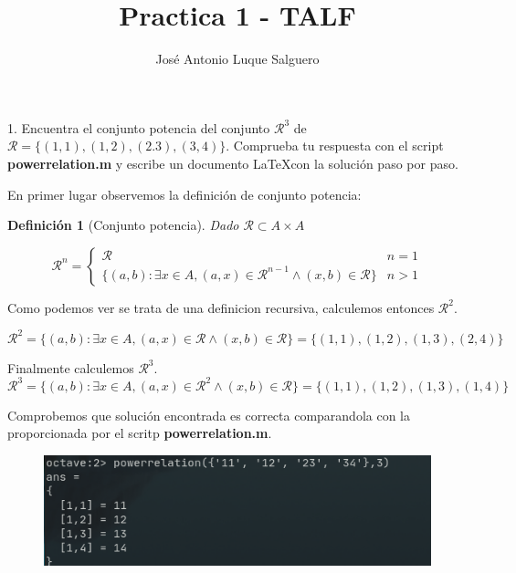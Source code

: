 \documentclass[12pt,a4paper]{article}
\title{Practica 1 - TALF}
\author{José Antonio Luque Salguero}
\date{}
\begin{document}
\newtheorem*{definicion}{Definición}

\maketitle

1. Encuentra el conjunto potencia del conjunto $ \mathcal{R}^{3} $ de $\mathcal{R} = \{ (1,1), (1,2), (2.3), (3,4) \}$.
 Comprueba tu respuesta con el script \textbf{powerrelation.m} y escribe un documento \LaTeX con la solución paso por paso.

 \vspace*{4mm}

En primer lugar observemos la definición de conjunto potencia:

\begin{definicion}[Conjunto potencia] 
Dado $\mathcal{R} \subset A \times A $

\[ 
  \mathcal{R}^{n}= \begin{cases} 
    \mathcal{R} & n=1 \\
    \{ (a,b): \exists x \in A, (a,x) \in \mathcal{R}^{n-1} \wedge (x,b) \in \mathcal{R} \} & n>1
  \end{cases}
\]
\end{definicion}

Como podemos ver se trata de una definicion recursiva, calculemos entonces $\mathcal{R}^2$.

\[
  \mathcal{R}^{2} = \{ (a,b): \exists x \in A, (a,x) \in \mathcal{R}  \wedge (x,b) \in \mathcal{R} \} = \{ (1,1),(1,2), (1,3),(2,4)\}  
\]

Finalmente calculemos  $\mathcal{R}^3$.
\[
  \mathcal{R}^{3} = \{ (a,b): \exists x \in A, (a,x) \in \mathcal{R}^2  \wedge (x,b) \in \mathcal{R} \} = \{ (1,1),(1,2),(1,3),(1,4)\}  
\]

Comprobemos que solución encontrada es correcta comparandola con la proporcionada por el scritp \textbf{powerrelation.m}.
\begin{figure}[h]
\centering
\includegraphics{2021-10-17_15-14.png}
\end{figure}
\end{document}
